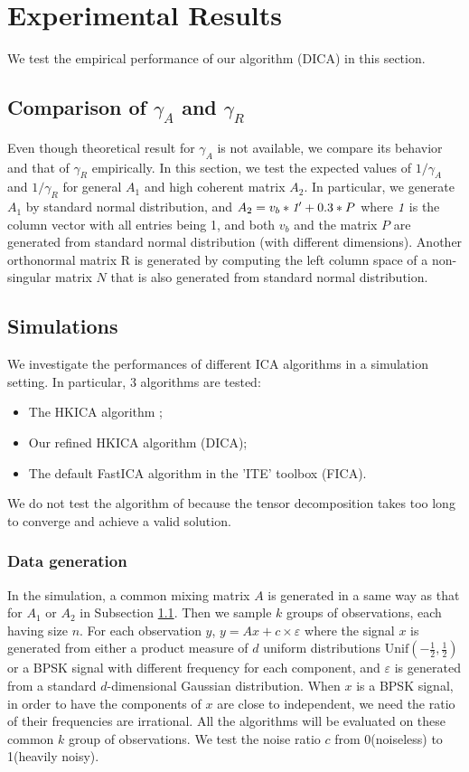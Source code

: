 \documentclass[twoside]{article}
\theoremstyle{definition}
\newcommand{\eps}{\varepsilon}
\begin{document}
\section{Experimental Results}
\label{sec:ExpRes}
We test the empirical performance of our algorithm (DICA) in this section. 
\subsection{Comparison of $\gamma_A$ and $\gamma_R$}
\label{subsec:comparisonGamma}
Even though theoretical result for $\gamma_A$ is not available, we compare its behavior and that of $\gamma_R$ empirically. 
In this section, we test the expected values of $1/\gamma_A$ and $1/\gamma_R$ for general $A_1$ and high coherent matrix $A_2$. 
In particular, we generate $A_1$ by standard normal distribution, and $A_2 = v_b*\emph{1}' + 0.3*P$ where $\emph{1}$ is the column vector with all entries being 1, and both $v_b$ and the matrix $P$ are generated from standard normal distribution (with different dimensions). 
Another orthonormal matrix R is generated by computing the left column space of a non-singular matrix $N$ that is also generated from  standard normal distribution.  

\subsection{Simulations}
We investigate the performances of different ICA algorithms in a simulation setting. In particular, 3 algorithms are tested: 
\begin{itemize}
\item The HKICA algorithm \citep{hsu2013learning};
\item Our refined HKICA algorithm (DICA);
\item The default FastICA algorithm in the 'ITE' toolbox \cite{szabo12separation} (FICA). 
\end{itemize}
We do not test the algorithm of \citep{anandkumar2012tensordecomposition} because the tensor decomposition takes too long to converge and achieve a valid solution. 
\subsubsection{Data generation}
In the simulation, a common mixing matrix $A$ is generated in a same way as that for $A_1$ or $A_2$ in Subsection \ref{subsec:comparisonGamma}. 
Then we sample $k$ groups of observations, each having size $n$. 
For each observation $y$, $y = Ax+ c\times\eps$ where the signal $x$ is generated from either a product measure of $d$ uniform distributions $\text{Unif}(-\frac12, \frac12)$ or a BPSK signal with different frequency for each component, and $\eps$ is generated from a standard $d$-dimensional Gaussian distribution. 
When $x$ is a BPSK signal, in order to have the components of $x$ are close to independent, we need the ratio of their frequencies are irrational.
All the algorithms will be evaluated on these common $k$ group of observations.
We test the noise ratio $c$ from 0(noiseless) to 1(heavily noisy). 
\end{document}
